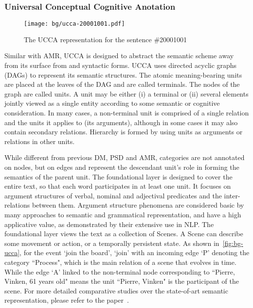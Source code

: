 \subsubsection{Universal Conceptual Cognitive Anotation}
\label{ssec:bg:ucca}

\begin{figure}[!th]
\centering
\texttt{[image: bg/ucca-20001001.pdf]}
\caption{\label{fig:bg-ucca}The UCCA representation for the sentence
  \#20001001}
\end{figure}

Similar with AMR, UCCA is designed to abstract the semantic scheme
away from its surface from and syntactic forms. UCCA uses directed
acyclic graphs (DAGs) to represent its semantic structures. The atomic
meaning-bearing units are placed at the leaves of the DAG and are
called terminals. The nodes of the graph are called units. A unit may
be either (i) a terminal or (ii) several elements jointly viewed as a
single entity according to some semantic or cognitive
consideration. In many cases, a non-terminal unit is comprised of a
single relation and the units it applies to (its arguments), although
in some cases it may also contain secondary relations. Hierarchy is
formed by using units as arguments or relations in other units.

While different from previous DM, PSD and AMR, categories are not
annotated on nodes, but on edges and represent the descendant unit's
role in forming the semantics of the parent unit. The foundational
layer is designed to cover the entire text, so that each word
participates in at least one unit. It focuses on argument structures
of verbal, nominal and adjectival predicates and the inter-relations
between them. Argument structure phenomena are considered basic by
many approaches to semantic and grammatical representation, and have a
high applicative value, as demonstrated by their extensive use in
NLP. The foundational layer views the text as a collection of
Scenes. A Scene can describe some movement or action, or a temporally
persistent state. As shown in~\autoref{fig:bg-ucca}, for the event
`join the board', `join' with an incoming edge `P' denoting the
category ``Process", which is the main relation of a scene that
evolves in time. While the edge `A' linked to the non-terminal node
corresponding to ``Pierre, Vinken, 61 years old" means the unit
``Pierre, Vinken" is the participant of the scene. For more detailed
comparative studies over the state-of-art semantic representation,
please refer to the paper~\cite{abend2017state}.

